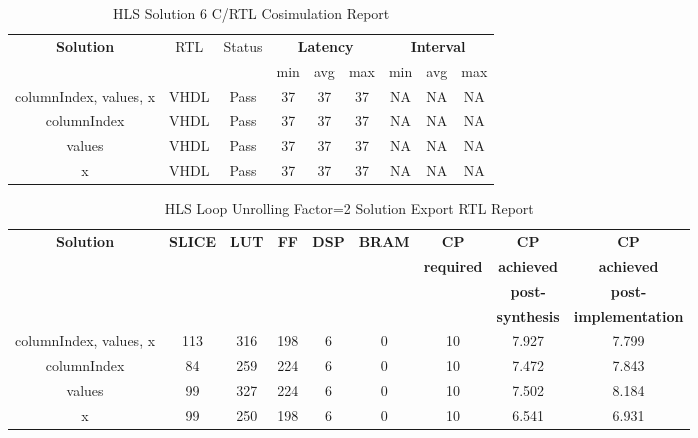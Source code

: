 \begin{table}[H]
	\centering
	\begin{tabular}{|c|c|c|c|c|c|c|c|c|}
		\hline
		\multicolumn{1}{|c|}{\textbf{Solution}} & \multicolumn{1}{|c|}{RTL} & \multicolumn{1}{|c|}{Status} & \multicolumn{3}{c|}{\textbf{Latency}} & \multicolumn{3}{c|}{\textbf{Interval}} \\
		& &  & min & avg & max & min & avg & max \\
		\hline
		columnIndex, values, x & VHDL & Pass & 37 & 37 & 37 & NA & NA & NA \\
		\hline
		columnIndex & VHDL & Pass & 37 & 37 & 37 & NA & NA & NA \\
		\hline
		values & VHDL & Pass & 37 & 37 & 37 & NA & NA & NA \\
		\hline
		x & VHDL & Pass & 37 & 37 & 37 & NA & NA & NA \\
		\hline
	\end{tabular}
	\caption{HLS Solution 6 C/RTL Cosimulation Report }
	\label{tab:hls-solution-6-cosimulation-report}
\end{table}

\begin{table}[H]
	\centering
	\begin{tabular}{|c|c|c|c|c|c|c|c|c|}
		\hline
		\textbf{Solution} & \textbf{SLICE} & \textbf{LUT} & \textbf{FF} & \textbf{DSP} & \textbf{BRAM} & \textbf{CP} & \textbf{CP} & \textbf{CP} \\
		& & & & & & \textbf{required} & \textbf{achieved} & \textbf{achieved}\\
		& & & & & & & \textbf{post-} & \textbf{post-}\\
		& & & & & & & \textbf{synthesis} & \textbf{implementation}\\
		\hline
		columnIndex, values, x  & 113 & 316 & 198 & 6 & 0 & 10 & 7.927 & 7.799 \\
		\hline
		columnIndex  & 84 & 259 & 224 & 6 & 0 & 10 & 7.472 & 7.843 \\
		\hline
		values  & 99 & 327 & 224 & 6 & 0 & 10 & 7.502 & 8.184 \\
		\hline
		x  & 99 & 250 & 198 & 6 & 0 & 10 & 6.541 & 6.931 \\
		\hline
	\end{tabular}
	\caption{HLS Loop Unrolling Factor=2 Solution Export RTL Report}
	\label{tab:hls-solution-6-export-rtl-report}
\end{table}